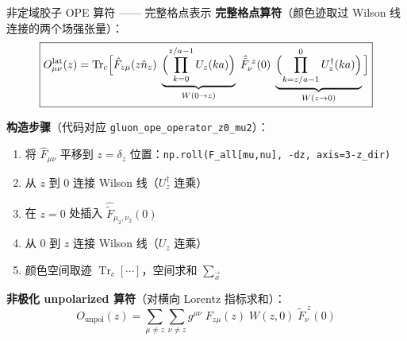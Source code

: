 \documentclass[10pt,aspectratio=169]{beamer}
\newcommand{\trc}{\operatorname{Tr}_c}
\begin{document}
\begin{frame}{非定域胶子 OPE 算符 —— 完整格点表示}
\small
\textbf{完整格点算符}（颜色迹取过 Wilson 线连接的两个场强张量）：
\begin{equation}
  \boxed{
  O_{\mu\nu}^{\text{lat}}(z) = \trc\!\Big[
  \hat{F}_{z\mu}(z\hat{n}_z)\;
  \underbrace{\Bigl(\prod_{k=0}^{z/a-1} U_z(k a)\Bigr)}_{W(0\to z)}\;
  \hat{\tilde{F}}_{\nu}^{\;z}(0)\;
  \underbrace{\Bigl(\prod_{k=z/a-1}^{0} U_z^\dagger(k a)\Bigr)}_{W(z\to 0)}
  \Big]
  }
\end{equation}

\textbf{构造步骤}（代码对应 \texttt{gluon\_ope\_operator\_z0\_mu2}）：
\begin{enumerate}
  \item[1.] 将 $\hat{F}_{\mu\nu}$ 平移到 $z = \delta_z$ 位置：\texttt{np.roll(F\_all[mu,nu], -dz, axis=3-z\_dir)}
  \item[2.] 从 $z$ 到 $0$ 连接 Wilson 线（$U_z^\dagger$ 连乘）
  \item[3.] 在 $z=0$ 处插入 $\hat{\tilde{F}}_{\mu_2,\nu_2}(0)$
  \item[4.] 从 $0$ 到 $z$ 连接 Wilson 线（$U_z$ 连乘）
  \item[5.] 颜色空间取迹 $\trc[\cdots]$，空间求和 $\sum_{\vec{x}}$
\end{enumerate}

\textbf{非极化 unpolarized 算符}（对横向 Lorentz 指标求和）：
\begin{equation}
  O_{\text{unpol}}(z) = \sum_{\mu \neq z} \sum_{\nu \neq z} g^{\mu\nu}\;
  F_{z\mu}(z)\;W(z,0)\;\tilde{F}_{\nu}^{\;z}(0)
\end{equation}
\end{frame}
\end{document}
